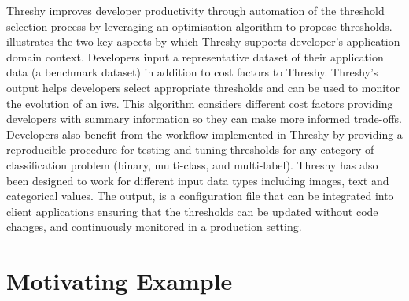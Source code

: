 Threshy improves developer productivity through automation of the threshold selection process by leveraging an optimisation algorithm to propose thresholds.  illustrates the two key aspects by which Threshy supports developer's application domain context. Developers input a representative dataset of their application data (a benchmark dataset) in addition to cost factors to Threshy. Threshy's output helps developers select appropriate thresholds and can be used to monitor the evolution of an \gls{iws}.%
This algorithm considers different cost factors providing developers with summary information so they can make more informed trade-offs. Developers also benefit from the workflow implemented in Threshy by providing a reproducible procedure for testing and tuning thresholds for any category of classification problem (binary, multi-class, and multi-label). Threshy has also been designed to work for different input data types including images, text and categorical values. The output, is a configuration file that can be integrated into client applications ensuring that the thresholds can be updated without code changes, and continuously monitored in a production setting. 



\section{Motivating Example}
\label{sec:motivating-example}

